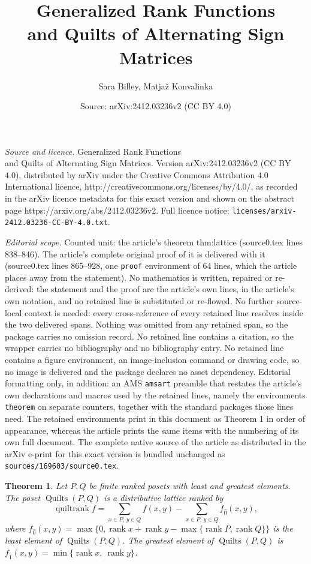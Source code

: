 \documentclass[10pt,a4paper]{amsart}
\title{Generalized Rank Functions \\ and Quilts of Alternating Sign Matrices}
\author{Sara Billey, Matja\v{z} Konvalinka}
\date{Source: arXiv:2412.03236v2 (CC BY 4.0)}
\newtheorem{theorem}{Theorem}
\newcommand{\quilt}{\operatorname{Quilts}}
\newcommand{\rank}{\operatorname{rank}}
\DeclareMathOperator{\rk}{quiltrank}
\begin{document}
\maketitle

\noindent\emph{Source and licence.} Generalized Rank Functions \\ and Quilts of Alternating Sign Matrices. Version arXiv:2412.03236v2 (CC BY 4.0), distributed by arXiv under the Creative Commons Attribution 4.0 International licence, http://creativecommons.org/licenses/by/4.0/, as recorded in the arXiv licence metadata for this exact version and shown on the abstract page https://arxiv.org/abs/2412.03236v2. Full licence notice: \texttt{licenses/arxiv-2412.03236-CC-BY-4.0.txt}.\par\smallskip

\noindent\textit{Editorial scope.} Counted unit: the article's theorem thm:lattice (source0.tex lines 838--846). The article's complete original proof of it is delivered with it (source0.tex lines 865--928, one \texttt{proof} environment of 64 lines, which the article places away from the statement). No mathematics is written, repaired or re-derived: the statement and the proof are the article's own lines, in the article's own notation, and no retained line is substituted or re-flowed.  No further source-local context is needed: every cross-reference of every retained line resolves inside the two delivered spans.  Nothing was omitted from any retained span, so the package carries no omission record.  No retained line contains a citation, so the wrapper carries no bibliography and no bibliography entry.  No retained line contains a figure environment, an image-inclusion command or drawing code, so no image is delivered and the package declares no asset dependency.  Editorial formatting only, in addition: an AMS \texttt{amsart} preamble that restates the article's own declarations and macros used by the retained lines, namely the environments \texttt{theorem} on separate counters, together with the standard packages those lines need.  The retained environments print in this document as Theorem 1 in order of appearance, whereas the article prints the same items with the numbering of its own full document.  The complete native source of the article as distributed in the arXiv e-print for this exact version is bundled unchanged as \texttt{sources/169603/source0.tex}.
\begin{theorem} \label{thm:lattice}
Let $P,Q$ be finite ranked posets with least and greatest elements.
The poset $\quilt(P,Q)$ is a distributive lattice ranked by $$\rk f =
\sum_{x \in P,\, y \in Q} f(x,y) - \sum_{x \in P,\, y \in Q} f_{\hat
0}(x,y),$$ where $f_{\hat 0}(x,y) = \max\{0,\rank x + \rank y -
\max\{\rank P,\rank Q\}\}$ is the least element of $\quilt(P,Q)$. The greatest
element of $\quilt(P,Q)$ is $f_{\hat 1}(x,y) = \min\{\rank x,\ \rank
y\}$.
\end{theorem}
\end{document}
